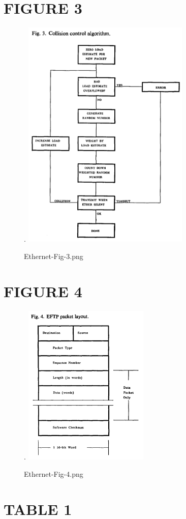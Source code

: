 \documentclass[11pt]{amsart}
\begin{document}


 

\newpage
\section*{FIGURE 3} 

\begin{figure}[h!]. \centering  \includegraphics[trim =0mm 0mm 0mm 0mm, clip, width=8cm]{Ethernet-Fig-3.png}    \caption{Ethernet-Fig-3.png} \end{figure}

 

\newpage
\section*{FIGURE 4} 

\begin{figure}[h!]. \centering  \includegraphics[trim =0mm 0mm 0mm 0mm, clip, width=6cm]{Ethernet-Fig-4.png}    \caption{Ethernet-Fig-4.png} \end{figure}



% 
 
 \section*{TABLE 1}

 



\end{document}
